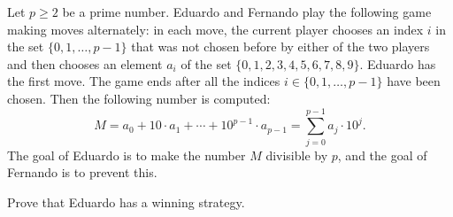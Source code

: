 Let $p \geq 2$ be a prime number. Eduardo and Fernando play the following game making moves alternately: in each move, the current player chooses an index $i$ in the set $\{0, 1, \ldots, p-1\}$ that was not chosen before by either of the two players and then chooses an element $a_i$ of the set $\{0, 1, 2, 3, 4, 5, 6, 7, 8, 9\}$. Eduardo has the first move. The game ends after all the indices $i \in \{0, 1, \ldots, p-1\}$ have been chosen. Then the following number is computed:
\[
M = a_0 + 10 \cdot a_1 + \cdots + 10^{p-1} \cdot a_{p-1} = \sum_{j=0}^{p-1} a_j \cdot 10^j.
\]
The goal of Eduardo is to make the number $M$ divisible by $p$, and the goal of Fernando is to prevent this.

Prove that Eduardo has a winning strategy.

